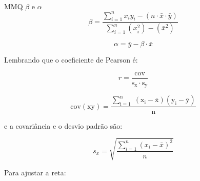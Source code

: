 \documentclass[11pt]{article}
\begin{document}
    \begin{center}
    \end{center}
    { \hspace*{\fill} \\}
    
    MMQ \(\beta\) e \(\alpha\) \[
    \beta = \frac{\displaystyle\sum_{i=1}^{n} x_i y_i - (n\cdot\bar{x}\cdot\bar{y})}{\displaystyle\sum_{i=1}^{n}(x_i^2) - (\bar{x}^2)}
\]

\[
\alpha = \bar{y}-\beta\cdot \bar{x}
\]

Lembrando que o coeficiente de Pearson é:

\[
r = \mathrm{\frac{cov}{s_x\cdot s_y}}
\]

\[
\mathrm{cov(xy)=\frac{\displaystyle\sum_{i=1}^n\;(x_i-\bar{x})(y_i - \bar{y})}{n}}
\]

e a covariância e o desvio padrão são:

\[
{s_x=\sqrt{\frac{\displaystyle\sum_{i=1}^n(x_i - \bar{x})^2}{n}}}
\]

Para ajustar a reta:
\end{document}
